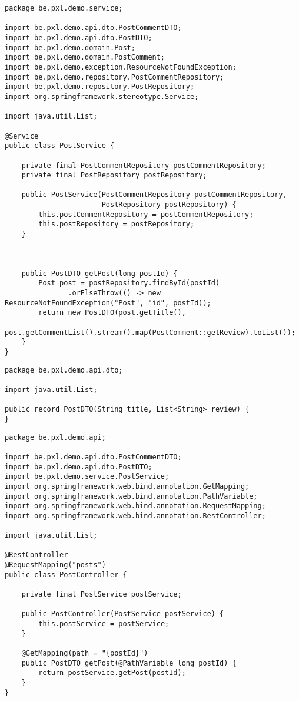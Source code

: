 \begin{lstlisting}
package be.pxl.demo.service;

import be.pxl.demo.api.dto.PostCommentDTO;
import be.pxl.demo.api.dto.PostDTO;
import be.pxl.demo.domain.Post;
import be.pxl.demo.domain.PostComment;
import be.pxl.demo.exception.ResourceNotFoundException;
import be.pxl.demo.repository.PostCommentRepository;
import be.pxl.demo.repository.PostRepository;
import org.springframework.stereotype.Service;

import java.util.List;

@Service
public class PostService {

    private final PostCommentRepository postCommentRepository;
    private final PostRepository postRepository;

    public PostService(PostCommentRepository postCommentRepository,
                       PostRepository postRepository) {
        this.postCommentRepository = postCommentRepository;
        this.postRepository = postRepository;
    }

   

    public PostDTO getPost(long postId) {
        Post post = postRepository.findById(postId)
               .orElseThrow(() -> new ResourceNotFoundException("Post", "id", postId));
        return new PostDTO(post.getTitle(), 
                 post.getCommentList().stream().map(PostComment::getReview).toList());
    }
}
\end{lstlisting}

\begin{lstlisting}
package be.pxl.demo.api.dto;

import java.util.List;

public record PostDTO(String title, List<String> review) {
}
\end{lstlisting}


\begin{lstlisting}
package be.pxl.demo.api;

import be.pxl.demo.api.dto.PostCommentDTO;
import be.pxl.demo.api.dto.PostDTO;
import be.pxl.demo.service.PostService;
import org.springframework.web.bind.annotation.GetMapping;
import org.springframework.web.bind.annotation.PathVariable;
import org.springframework.web.bind.annotation.RequestMapping;
import org.springframework.web.bind.annotation.RestController;

import java.util.List;

@RestController
@RequestMapping("posts")
public class PostController {

    private final PostService postService;

    public PostController(PostService postService) {
        this.postService = postService;
    }

    @GetMapping(path = "{postId}")
    public PostDTO getPost(@PathVariable long postId) {
        return postService.getPost(postId);
    }
}
\end{lstlisting}

